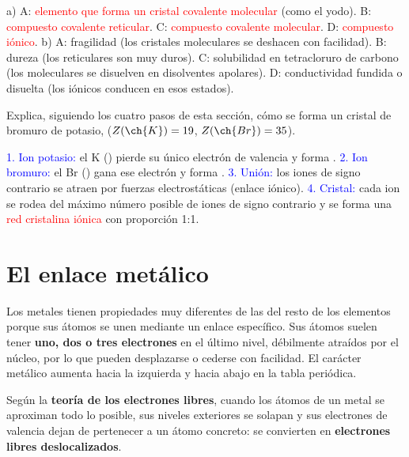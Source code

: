 \begin{exercise}
\begin{enumerate}[label=\alph*)]
    \end{enumerate}
    \begin{solu}
        a) A: \textcolor{red}{elemento que forma un cristal covalente molecular} (como el yodo). B: \textcolor{red}{compuesto covalente reticular}. C: \textcolor{red}{compuesto covalente molecular}. D: \textcolor{red}{compuesto iónico}.
        b) A: fragilidad (los cristales moleculares se deshacen con facilidad). B: dureza (los reticulares son muy duros). C: solubilidad en tetracloruro de carbono (los moleculares se disuelven en disolventes apolares). D: conductividad fundida o disuelta (los iónicos conducen en esos estados).
    \end{solu}
\end{exercise}

\begin{exercise}
    Explica, siguiendo los cuatro pasos de esta sección, cómo se forma un cristal de bromuro de potasio,  (\(Z(\ch{K}) = 19\), \(Z(\ch{Br}) = 35\)).
    \begin{solu}
        \textcolor{blue}{1. Ion potasio:} el K () pierde su único electrón de valencia y forma . \textcolor{blue}{2. Ion bromuro:} el Br () gana ese electrón y forma . \textcolor{blue}{3. Unión:} los iones de signo contrario se atraen por fuerzas electrostáticas (enlace iónico). \textcolor{blue}{4. Cristal:} cada ion se rodea del máximo número posible de iones de signo contrario y se forma una \textcolor{red}{red cristalina iónica} con proporción 1:1.
    \end{solu}
\end{exercise}

\section{El enlace metálico}

Los metales tienen propiedades muy diferentes de las del resto de los elementos porque sus átomos se unen mediante un enlace específico. Sus átomos suelen tener \textbf{uno, dos o tres electrones} en el último nivel, débilmente atraídos por el núcleo, por lo que pueden desplazarse o cederse con facilidad. El carácter metálico aumenta hacia la izquierda y hacia abajo en la tabla periódica.

Según la \textbf{teoría de los electrones libres}, cuando los átomos de un metal se aproximan todo lo posible, sus niveles exteriores se solapan y sus electrones de valencia dejan de pertenecer a un átomo concreto: se convierten en \textbf{electrones libres deslocalizados}.

